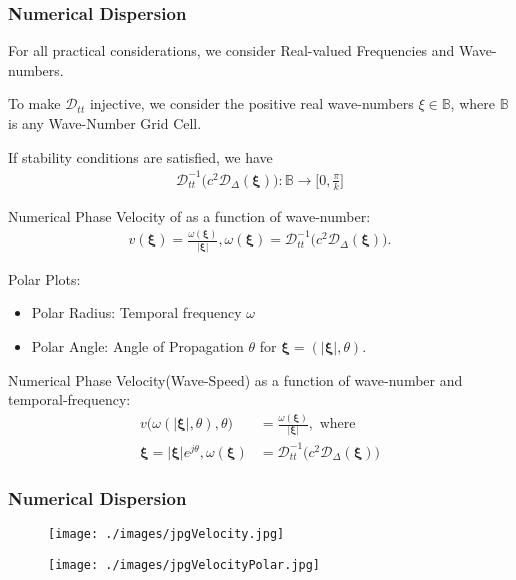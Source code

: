 \documentclass{beamer}
\begin{document}
\begin{frame}
\frametitle{Numerical Dispersion}
For all practical considerations, we consider Real-valued Frequencies and Wave-numbers.

To make $\mathcal{D}_{tt}$ injective, we consider the positive real wave-numbers $\xi \in \mathbb{B}$, where $\mathbb{B}$ is any Wave-Number Grid Cell.

If stability conditions are satisfied, we have
\begin{align}
\mathcal{D}_{tt}^{-1}\bigg( c^2 \mathcal{D}_{\Delta}(\mathbf{\xi})\bigg) : \mathbb{B}  \rightarrow \bigg[0, \frac{\pi}{k}\bigg]
\end{align}

Numerical Phase Velocity of as a function of wave-number:
\begin{align}
v(\mathbf{\xi}) = \frac{\omega(\mathbf{\xi})}{|\mathbf{\xi}|}, \omega(\mathbf{\xi}) = \mathcal{D}_{tt}^{-1}\bigg( c^2 \mathcal{D}_{\Delta}(\mathbf{\xi})\bigg).
\end{align}

Polar Plots: 
\begin{itemize}
\item Polar Radius: Temporal frequency $\omega$
\item Polar Angle: Angle of Propagation $\theta$ for $\mathbf{\xi} = (|\mathbf{\xi}|,\theta)$.
\end{itemize}

Numerical Phase Velocity(Wave-Speed) as a function of wave-number and temporal-frequency:
\begin{align*}
v\big(\omega(|\mathbf{\xi}|,\theta), \theta ) &= \frac{\omega(\mathbf{\xi})}{|\mathbf{\xi}|}, \text{ where }\\
\mathbf{\xi} = |\mathbf{\xi}|e^{j\theta}, \omega(\mathbf{\xi}) &= \mathcal{D}_{tt}^{-1}\bigg( c^2 \mathcal{D}_{\Delta}(\mathbf{\xi})\bigg)
\end{align*}

 
\end{frame}

\begin{frame}
\frametitle{Numerical Dispersion}

\begin{figure}
\centering
\begin{minipage}{.5\textwidth}
  \centering
\texttt{[image: ./images/jpgVelocity.jpg]}
\label{fig:NumericalDispersion}
\end{minipage}%
\begin{minipage}{.5\textwidth}
  \centering
\texttt{[image: ./images/jpgVelocityPolar.jpg]}
\label{fig:NumericalDispersionPolar}
\end{minipage}
\end{figure}



\end{frame}

\end{document}

